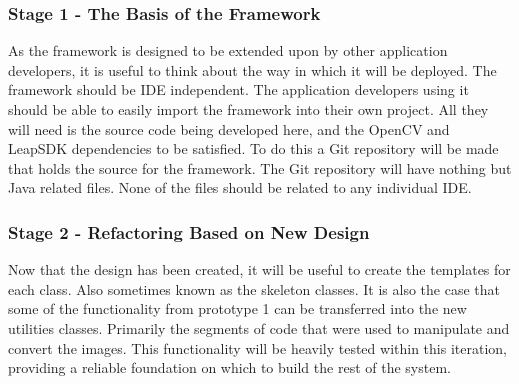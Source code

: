 \documentclass[11pt,oneside]{report}
\begin{document}
		\subsubsection{Stage 1 - The Basis of the Framework}
			As the framework is designed to be extended upon by other application developers, it is useful to think about the way in which it will be deployed.
			The framework should be IDE independent.
			The application developers using it should be able to easily import the framework into their own project.
			All they will need is the source code being developed here, and the OpenCV and LeapSDK dependencies to be satisfied.
			To do this a Git repository will be made that holds the source for the framework.
			The Git repository will have nothing but Java related files.
			None of the files should be related to any individual IDE.
		\subsubsection{Stage 2 - Refactoring Based on New Design}
			Now that the design has been created, it will be useful to create the templates for each class.
			Also sometimes known as the skeleton classes.
			It is also the case that some of the functionality from prototype 1 can be transferred into the new utilities classes.
			Primarily the segments of code that were used to manipulate and convert the images.
			This functionality will be heavily tested within this iteration, providing a reliable foundation on which to build the rest of the system.
			
\end{document}
